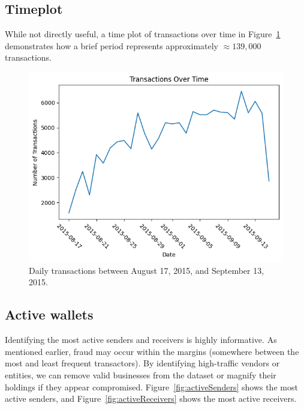 \documentclass[sigconf]{acmart}
\begin{document}
\subsection{Timeplot}
While not directly useful, a time plot of transactions over time in Figure~\ref{fig:timePlot} demonstrates how a brief period represents approximately \( \approx 139,000 \) transactions.

\begin{figure}[H]
    \centering
    \includegraphics[width=0.8\linewidth]{M4-transactions-timeplot.png}
    \caption{Daily transactions between August 17, 2015, and September 13, 2015.}
    \label{fig:timePlot}
\end{figure}

\subsection{Active wallets}
Identifying the most active senders and receivers is highly informative. As mentioned earlier, fraud may occur within the margins (somewhere between the most and least frequent transactors). By identifying high-traffic vendors or entities, we can remove valid businesses from the dataset or magnify their holdings if they appear compromised. Figure~\ref{fig:activeSenders} shows the most active senders, and Figure~\ref{fig:activeReceivers} shows the most active receivers.
\end{document}
